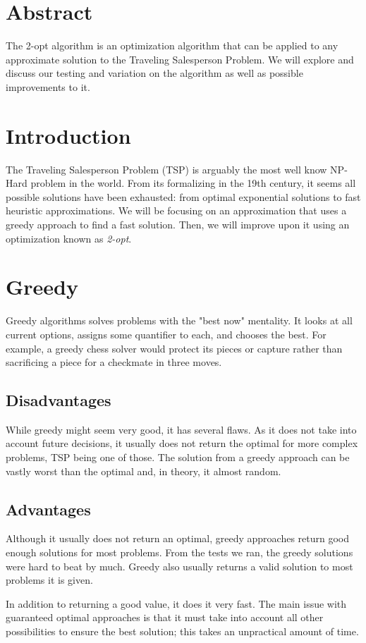 \documentclass[12pt]{report}
\begin{document}
\begin{multicols}{2}

    \section*{Abstract}
    The 2-opt algorithm is an optimization algorithm that can be applied to any approximate solution to the Traveling Salesperson Problem. We will explore and discuss our testing and variation on the algorithm as well as possible improvements to it.
    \section{Introduction}
    The Traveling Salesperson Problem (TSP) is arguably the most well know NP-Hard problem in the world. From its formalizing in the 19th century, it seems all possible solutions have been exhausted: from optimal exponential solutions to fast heuristic approximations. We will be focusing on an approximation that uses a greedy approach to find a fast solution. Then, we will improve upon it using an optimization known as \textit{2-opt}.

    \section{Greedy}
    Greedy algorithms solves problems with the "best now" mentality. It looks at all current options, assigns some quantifier to each, and chooses the best. For example, a greedy chess solver would protect its pieces or capture rather than sacrificing a piece for a checkmate in three moves.
    \subsection{Disadvantages}
    While greedy might seem very good, it has several flaws. As it does not take into account future decisions, it usually does not return the optimal for more complex problems, TSP being one of those. The solution from a greedy approach can be vastly worst than the optimal and, in theory, it almost random.
    \subsection{Advantages}
    Although it usually does not return an optimal, greedy approaches return good enough solutions for most problems. From the tests we ran, the greedy solutions were hard to beat by much. Greedy also usually returns a valid solution to most problems it is given.

    In addition to returning a good value, it does it very fast. The main issue with guaranteed optimal approaches is that it must take into account all other possibilities to ensure the best solution; this takes an unpractical amount of time.
\end{multicols}
\end{document}
